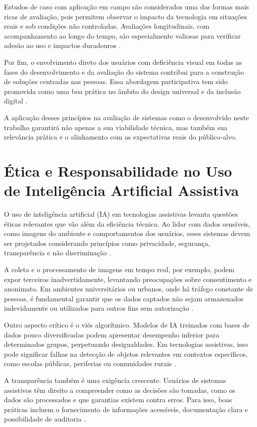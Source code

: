 Estudos de caso com aplicação em campo são considerados uma das formas mais ricas de avaliação, pois permitem observar o impacto da tecnologia em situações reais e sob condições não controladas. Avaliações longitudinais, com acompanhamento ao longo do tempo, são especialmente valiosas para verificar adesão ao uso e impactos duradouros \cite{Batavia1990}.

Por fim, o envolvimento direto dos usuários com deficiência visual em todas as fases do desenvolvimento e da avaliação do sistema contribui para a construção de soluções centradas nas pessoas. Essa abordagem participativa tem sido promovida como uma boa prática no âmbito do design universal e da inclusão digital \cite{Story1998}.

A aplicação desses princípios na avaliação de sistemas como o desenvolvido neste trabalho garantirá não apenas a sua viabilidade técnica, mas também sua relevância prática e o alinhamento com as expectativas reais do público-alvo.

\section{Ética e Responsabilidade no Uso de Inteligência Artificial Assistiva}

O uso de inteligência artificial (IA) em tecnologias assistivas levanta questões éticas relevantes que vão além da eficiência técnica. Ao lidar com dados sensíveis, como imagens do ambiente e comportamentos dos usuários, esses sistemas devem ser projetados considerando princípios como privacidade, segurança, transparência e não discriminação \cite{Floridi2018}.

A coleta e o processamento de imagens em tempo real, por exemplo, podem expor terceiros inadvertidamente, levantando preocupações sobre consentimento e anonimato. Em ambientes universitários ou urbanos, onde há tráfego constante de pessoas, é fundamental garantir que os dados captados não sejam armazenados indevidamente ou utilizados para outros fins sem autorização \cite{Jobin2019}.

Outro aspecto crítico é o viés algorítmico. Modelos de IA treinados com bases de dados pouco diversificadas podem apresentar desempenho inferior para determinados grupos, perpetuando desigualdades. Em tecnologias assistivas, isso pode significar falhas na detecção de objetos relevantes em contextos específicos, como escolas públicas, periferias ou comunidades rurais \cite{Buolamwini2018}.

A transparência também é uma exigência crescente. Usuários de sistemas assistivos têm direito a compreender como as decisões são tomadas, como os dados são processados e que garantias existem contra erros. Para isso, boas práticas incluem o fornecimento de informações acessíveis, documentação clara e possibilidade de auditoria \cite{Morley2020}.

